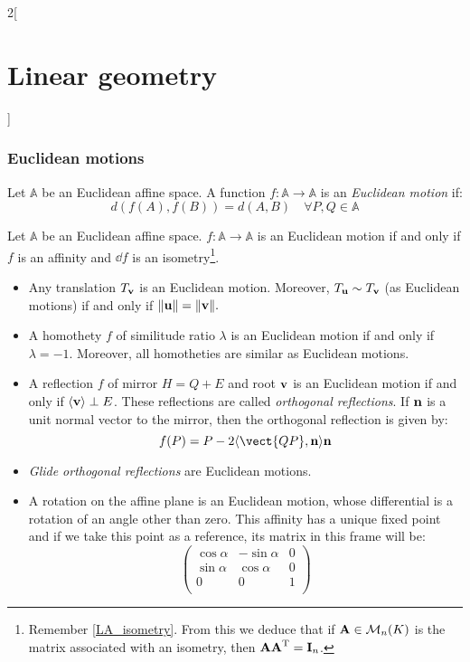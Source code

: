 \documentclass[../../../main_math.tex]{subfiles}
\begin{document}
\begin{multicols}{2}[\section{Linear geometry}]
  \subsubsection{Euclidean motions}
  \label{LG_euclidean_motion}
  \begin{definition}
    Let $\mathbb{A}$ be an Euclidean affine space. A function $f:\mathbb{A}\rightarrow\mathbb{A}$ is an \emph{Euclidean motion} if: $$d(f(A),f(B))=d(A,B)\quad\forall P,Q\in\mathbb{A}$$
  \end{definition}
  \begin{proposition}
    Let $\mathbb{A}$ be an Euclidean affine space. $f:\mathbb{A}\rightarrow\mathbb{A}$ is an Euclidean motion if and only if $f$ is an affinity and $\dd{f}$ is an isometry\footnote{Remember \cref{LA_isometry}. From this we deduce that if $\boldsymbol{\mathrm{A}}\in\mathcal{M}_n(K)$ is the matrix associated with an isometry, then $\boldsymbol{\mathrm{A}}{\boldsymbol{\mathrm{A}}}^{\mathrm{T}}=\boldsymbol{\mathrm{I}}_n$.}.
  \end{proposition}
  \begin{proposition}
    \hfill
    \begin{itemize}
      \item Any translation $T_{\boldsymbol{\mathrm{v}}}$ is an Euclidean motion. Moreover, $T_{\boldsymbol{\mathrm{u}}}\sim T_{\boldsymbol{\mathrm{v}}}$ (as Euclidean motions) if and only if $\|\boldsymbol{\mathrm{u}}\|=\|\boldsymbol{\mathrm{v}}\|.$
      \item A homothety $f$ of similitude ratio $\lambda$ is an Euclidean motion if and only if $\lambda=-1$. Moreover, all homotheties are similar as Euclidean motions.
      \item A reflection $f$ of mirror $H=Q+E$ and root $\boldsymbol{\mathrm{v}}$ is an Euclidean motion if and only if $\langle\boldsymbol{\mathrm{v}}\rangle\perp E$. These reflections are called \emph{orthogonal reflections}. If $\boldsymbol{\mathrm{n}}$ is a unit normal vector to the mirror, then the orthogonal reflection is given by: $$f(P)=P-2\langle\vect{QP},\vf{n}\rangle\vf{n}$$
      \item \emph{Glide orthogonal reflections} are Euclidean motions.
      \item A rotation on the affine plane is an Euclidean motion, whose differential is a rotation of an angle other than zero. This affinity has a unique fixed point and if we take this point as a reference, its matrix in this frame will be: $$\begin{pmatrix}
                \cos\alpha & -\sin\alpha & 0 \\
                \sin\alpha & \cos\alpha  & 0 \\
                0          & 0           & 1 \\
              \end{pmatrix}$$
    \end{itemize}
  \end{proposition}

\end{multicols}
\end{document}
